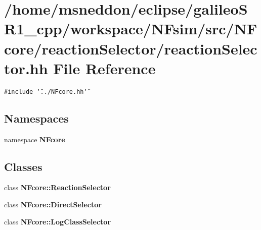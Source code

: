 \section{/home/msneddon/eclipse/galileoSR1\_\-cpp/workspace/NFsim/src/NFcore/reactionSelector/reactionSelector.hh File Reference}
\label{reactionSelector_8hh}


{\tt \#include \char`\"{}../NFcore.hh\char`\"{}}\par
\subsection*{Namespaces}
\begin{CompactItemize}
\item 
namespace {\bf NFcore}
\end{CompactItemize}
\subsection*{Classes}
\begin{CompactItemize}
\item 
class {\bf NFcore::ReactionSelector}
\item 
class {\bf NFcore::DirectSelector}
\item 
class {\bf NFcore::LogClassSelector}
\end{CompactItemize}
